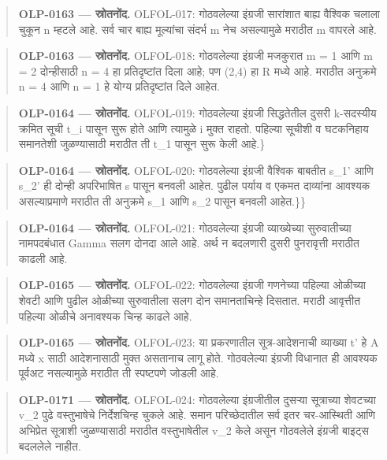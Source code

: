 \begin{quote}\small\textbf{OLP-0163 — स्रोतनोंद.} OLFOL-017: गोठवलेल्या इंग्रजी सारांशात बाह्य वैश्विक चलाला चुकून n म्हटले आहे. सर्व चार बाह्य मूल्यांचा संदर्भ m नेच असल्यामुळे मराठीत m वापरले आहे.\end{quote}
\begin{quote}\small\textbf{OLP-0163 — स्रोतनोंद.} OLFOL-018: गोठवलेल्या इंग्रजी मजकुरात m = 1 आणि m = 2 दोन्हीसाठी n = 4 हा प्रतिदृष्टांत दिला आहे; पण (2,4) हा R मध्ये आहे. मराठीत अनुक्रमे n = 4 आणि n = 1 हे योग्य प्रतिदृष्टांत दिले आहेत.\end{quote}
\begin{quote}\small\textbf{OLP-0164 — स्रोतनोंद.} OLFOL-019: गोठवलेल्या इंग्रजी सिद्धतेतील दुसरी k-सदस्यीय क्रमित सूची t\_i पासून सुरू होते आणि त्यामुळे i मुक्त राहतो. पहिल्या सूचीशी व घटकनिहाय समानतेशी जुळण्यासाठी मराठीत ती t\_1 पासून सुरू केली आहे.\}\end{quote}
\begin{quote}\small\textbf{OLP-0164 — स्रोतनोंद.} OLFOL-020: गोठवलेल्या इंग्रजी वैश्विक बाबतीत s\_1' आणि s\_2' ही दोन्ही अपरिभाषित s पासून बनवली आहेत. पुढील पर्याय व एकमत दाव्यांना आवश्यक असल्याप्रमाणे मराठीत ती अनुक्रमे s\_1 आणि s\_2 पासून बनवली आहेत.\}\}\end{quote}
\begin{quote}\small\textbf{OLP-0164 — स्रोतनोंद.} OLFOL-021: गोठवलेल्या इंग्रजी व्याख्येच्या सुरुवातीच्या नामपदबंधात Gamma सलग दोनदा आले आहे. अर्थ न बदलणारी दुसरी पुनरावृत्ती मराठीत काढली आहे.\end{quote}
\begin{quote}\small\textbf{OLP-0165 — स्रोतनोंद.} OLFOL-022: गोठवलेल्या इंग्रजी गणनेच्या पहिल्या ओळीच्या शेवटी आणि पुढील ओळीच्या सुरुवातीला सलग दोन समानताचिन्हे दिसतात. मराठी आवृत्तीत पहिल्या ओळीचे अनावश्यक चिन्ह काढले आहे.\end{quote}
\begin{quote}\small\textbf{OLP-0165 — स्रोतनोंद.} OLFOL-023: या प्रकरणातील सूत्र-आदेशनाची व्याख्या t' हे A मध्ये x साठी आदेशनासाठी मुक्त असतानाच लागू होते. गोठवलेल्या इंग्रजी विधानात ही आवश्यक पूर्वअट नसल्यामुळे मराठीत ती स्पष्टपणे जोडली आहे.\end{quote}
\begin{quote}\small\textbf{OLP-0171 — स्रोतनोंद.} OLFOL-024: गोठवलेल्या इंग्रजीतील दुसऱ्या सूत्राच्या शेवटच्या v\_2 पुढे वस्तुभाषेचे निर्देशचिन्ह चुकले आहे. समान परिच्छेदातील सर्व इतर चर-आस्थिती आणि अभिप्रेत सूत्राशी जुळण्यासाठी मराठीत वस्तुभाषेतील v\_2 केले असून गोठवलेले इंग्रजी बाइट्स बदललेले नाहीत.\end{quote}
